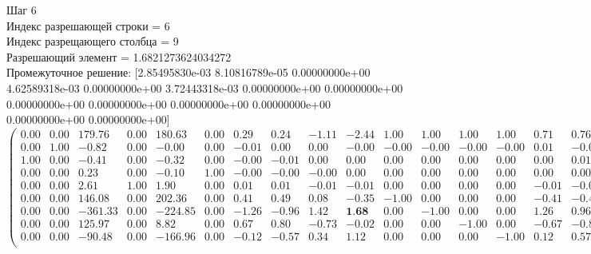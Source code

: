 \documentclass{article}
\begin{document}
\begin{flushleft}
    Шаг 6\\
Индекс разрешающей строки = 6\\
Индекс разрещающего столбца = 9\\
Разрешающий элемент = 1.6821273624034272\\
Промежуточное решение:
 [2.85495830e-03 8.10816789e-05 0.00000000e+00 4.62589318e-03
 0.00000000e+00 3.72443318e-03 0.00000000e+00 0.00000000e+00
 0.00000000e+00 0.00000000e+00 0.00000000e+00 0.00000000e+00
 0.00000000e+00 0.00000000e+00]
\begin{equation*}
\begin{pmatrix}
 0.00 & 0.00 &  179.76 & 0.00 &  180.63 & 0.00 &  0.29 &  0.24 & -1.11 & -2.44 &  1.00 &  1.00 &  1.00 &  1.00 &  0.71 &  0.76 &  2.11 &  3.44 & 0.00 & 0.00 & 0.00 & 0.00 & -0.99 \\
 0.00 & 1.00 &   -0.82 & 0.00 &   -0.00 & 0.00 & -0.01 &  0.00 &  0.00 & -0.00 & -0.00 & -0.00 & -0.00 & -0.00 &  0.01 & -0.00 & -0.00 &  0.00 & 0.00 & 0.00 & 0.00 & 0.00 &  0.00 \\
 1.00 & 0.00 &   -0.41 & 0.00 &   -0.32 & 0.00 & -0.00 & -0.01 &  0.00 &  0.00 &  0.00 &  0.00 &  0.00 &  0.00 &  0.00 &  0.01 & -0.00 & -0.00 & 0.00 & 0.00 & 0.00 & 0.00 &  0.00 \\
 0.00 & 0.00 &    0.23 & 0.00 &   -0.10 & 1.00 & -0.00 & -0.00 & -0.00 &  0.00 &  0.00 &  0.00 &  0.00 &  0.00 &  0.00 &  0.00 &  0.00 & -0.00 & 0.00 & 0.00 & 0.00 & 0.00 &  0.00 \\
 0.00 & 0.00 &    2.61 & 1.00 &    1.90 & 0.00 &  0.01 &  0.01 & -0.01 & -0.01 &  0.00 &  0.00 &  0.00 &  0.00 & -0.01 & -0.01 &  0.01 &  0.01 & 0.00 & 0.00 & 0.00 & 0.00 &  0.00 \\
 0.00 & 0.00 &  146.08 & 0.00 &  202.36 & 0.00 &  0.41 &  0.49 &  0.08 & -0.35 & -1.00 &  0.00 &  0.00 &  0.00 & -0.41 & -0.49 & -0.08 &  0.35 & 1.00 & 0.00 & 0.00 & 0.00 &  0.37 \\
 0.00 & 0.00 & -361.33 & 0.00 & -224.85 & 0.00 & -1.26 & -0.96 &  1.42 &  \textbf{1.68} &  0.00 & -1.00 &  0.00 &  0.00 &  1.26 &  0.96 & -1.42 & -1.68 & 0.00 & 1.00 & 0.00 & 0.00 &  0.12 \\
 0.00 & 0.00 &  125.97 & 0.00 &    8.82 & 0.00 &  0.67 &  0.80 & -0.73 & -0.02 &  0.00 &  0.00 & -1.00 &  0.00 & -0.67 & -0.80 &  0.73 &  0.02 & 0.00 & 0.00 & 1.00 & 0.00 &  0.28 \\
 0.00 & 0.00 &  -90.48 & 0.00 & -166.96 & 0.00 & -0.12 & -0.57 &  0.34 &  1.12 &  0.00 &  0.00 &  0.00 & -1.00 &  0.12 &  0.57 & -0.34 & -1.12 & 0.00 & 0.00 & 0.00 & 1.00 &  0.22 \\
\end{pmatrix}
\end{equation*}
\end{flushleft}
\end{document}
